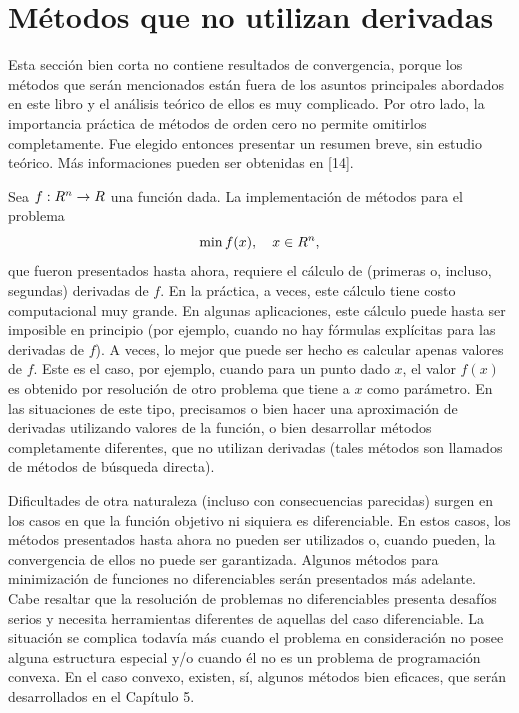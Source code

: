 
\section{Métodos que no utilizan derivadas}\label{v2:sec:3.5}

Esta sección bien corta no contiene resultados de convergencia, porque los métodos que serán mencionados están fuera de los asuntos principales abordados en este libro y el análisis teórico de ellos es muy complicado. Por otro lado, la importancia práctica de métodos de orden cero no permite omitirlos completamente. Fue elegido entonces presentar un resumen breve, sin estudio teórico. Más informaciones pueden ser obtenidas en [14].

Sea $f : R^n \to R$ una función dada. La implementación de métodos para el problema
\begin{equation}
    \min f(x), \quad x \in R^n,
    \label{v2:eq:3.139}
\end{equation}
que fueron presentados hasta ahora, requiere el cálculo de (primeras o, incluso, segundas) derivadas de $f$. En la práctica, a veces, este cálculo tiene costo computacional muy grande. En algunas aplicaciones, este cálculo puede hasta ser imposible en principio (por ejemplo, cuando no hay fórmulas explícitas para las derivadas de $f$). A veces, lo mejor que puede ser hecho es calcular apenas valores de $f$. Este es el caso, por ejemplo, cuando para un punto dado $x$, el valor $f(x)$ es obtenido por resolución de otro problema que tiene a $x$ como parámetro. En las situaciones de este tipo, precisamos o bien hacer una aproximación de derivadas utilizando valores de la función, o bien desarrollar métodos completamente diferentes, que no utilizan derivadas (tales métodos son llamados de métodos de búsqueda directa).

Dificultades de otra naturaleza (incluso con consecuencias parecidas) surgen en los casos en que la función objetivo ni siquiera es diferenciable. En estos casos, los métodos presentados hasta ahora no pueden ser utilizados o, cuando pueden, la convergencia de ellos no puede ser garantizada. Algunos métodos para minimización de funciones no diferenciables serán presentados más adelante. Cabe resaltar que la resolución de problemas no diferenciables presenta desafíos serios y necesita herramientas diferentes de aquellas del caso diferenciable. La situación se complica todavía más cuando el problema en consideración no posee alguna estructura especial y/o cuando él no es un problema de programación convexa. En el caso convexo, existen, sí, algunos métodos bien eficaces, que serán desarrollados en el Capítulo 5.

